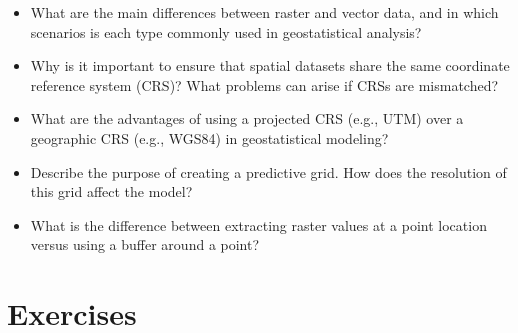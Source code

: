 \documentclass[
  letterpaper,
]{krantz}
\begin{document}
\begin{itemize}
\item
  What are the main differences between raster and vector data, and in
  which scenarios is each type commonly used in geostatistical analysis?
\item
  Why is it important to ensure that spatial datasets share the same
  coordinate reference system (CRS)? What problems can arise if CRSs are
  mismatched?
\item
  What are the advantages of using a projected CRS (e.g., UTM) over a
  geographic CRS (e.g., WGS84) in geostatistical modeling?
\item
  Describe the purpose of creating a predictive grid. How does the
  resolution of this grid affect the model?
\item
  What is the difference between extracting raster values at a point
  location versus using a buffer around a point?
\end{itemize}

\section{Exercises}\label{exercises}
\end{document}
